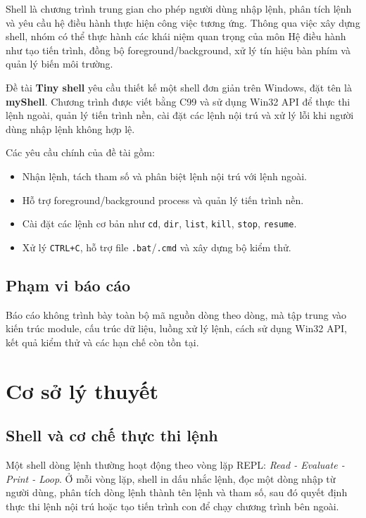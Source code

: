 \documentclass[13pt,a4paper,oneside]{extreport}
\begin{document}
Shell là chương trình trung gian cho phép người dùng nhập lệnh, phân tích lệnh và yêu cầu hệ điều hành thực hiện công việc tương ứng. Thông qua việc xây dựng shell, nhóm có thể thực hành các khái niệm quan trọng của môn Hệ điều hành như tạo tiến trình, đồng bộ foreground/background, xử lý tín hiệu bàn phím và quản lý biến môi trường.

Đề tài \textbf{Tiny shell} yêu cầu thiết kế một shell đơn giản trên Windows, đặt tên là \textbf{myShell}. Chương trình được viết bằng C99 và sử dụng Win32 API để thực thi lệnh ngoài, quản lý tiến trình nền, cài đặt các lệnh nội trú và xử lý lỗi khi người dùng nhập lệnh không hợp lệ.

Các yêu cầu chính của đề tài gồm:
\begin{itemize}[leftmargin=1.2cm]
	\item Nhận lệnh, tách tham số và phân biệt lệnh nội trú với lệnh ngoài.
	\item Hỗ trợ foreground/background process và quản lý tiến trình nền.
	\item Cài đặt các lệnh cơ bản như \texttt{cd}, \texttt{dir}, \texttt{list}, \texttt{kill}, \texttt{stop}, \texttt{resume}.
	\item Xử lý \texttt{CTRL+C}, hỗ trợ file \texttt{.bat}/\texttt{.cmd} và xây dựng bộ kiểm thử.
\end{itemize}

\section{Phạm vi báo cáo}

Báo cáo không trình bày toàn bộ mã nguồn dòng theo dòng, mà tập trung vào kiến trúc module, cấu trúc dữ liệu, luồng xử lý lệnh, cách sử dụng Win32 API, kết quả kiểm thử và các hạn chế còn tồn tại.

\chapter{Cơ sở lý thuyết}

\section{Shell và cơ chế thực thi lệnh}

Một shell dòng lệnh thường hoạt động theo vòng lặp REPL: \textit{Read - Evaluate - Print - Loop}. Ở mỗi vòng lặp, shell in dấu nhắc lệnh, đọc một dòng nhập từ người dùng, phân tích dòng lệnh thành tên lệnh và tham số, sau đó quyết định thực thi lệnh nội trú hoặc tạo tiến trình con để chạy chương trình bên ngoài.
\end{document}

